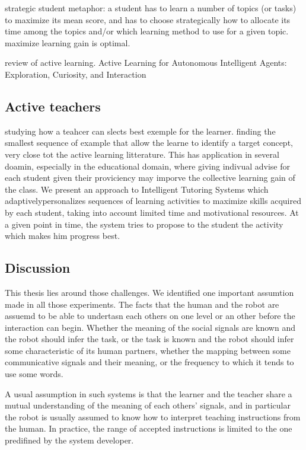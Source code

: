 \cite{lopes2012strategic} strategic student metaphor: a student has to learn a number of topics (or tasks) to maximize its mean score, and has to choose strategically how to allocate its time among the topics and/or which learning method to use for a given topic. maximize learning gain is optimal. 

\cite{lopes2014active} review of active learning. Active Learning for Autonomous Intelligent Agents: Exploration, Curiosity, and Interaction


\subsection{Active teachers}

\cite{cakmak2012algorithmic} studying how a teahcer can slects best exemple for the learner. finding the smallest sequence of example that allow the learne to identify a target concept, very close tot the active learning litterature. This has application in several doamin, especially in the educational domain, where giving indivual advise for each student given their proviciency may imporve the collective learning gain of the class. 
\cite{clement2014online} We present an approach to Intelligent Tutoring Systems which adaptivelypersonalizes sequences of learning activities to maximize skills acquired by each student, taking into account limited time and motivational resources. At a given point in time, the system tries to propose to the student the activity which makes him progress best.




\subsection{Discussion}

This thesis lies around those challenges. We identified one important assumtion made in all those experiments. The facts that the human and the robot are assuemd to be able to undertasn each others on one level or an other before the interaction can begin. Whether the meaning of the social signals are known and the robot should infer the task, or the task is known and the robot should infer some characteristic of its human partners, whether the mapping between some communicative signals and their meaning, or the frequency to which it tends to use some words.


A usual assumption in such systems is that the learner and the teacher share a mutual understanding of the meaning of each others' signals, and in particular the robot is usually assumed to know how to interpret teaching instructions from the human. In practice, the range of accepted instructions is limited to the one  predifined by the system developer.

